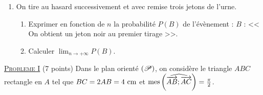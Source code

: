 \begin{description}
\begin{enumerate}
\begin{enumerate}
								$A$ : << On obtient un jeton rouge au premier tirage >>.
						\item Calculer $\displaystyle{\lim_{n\rightarrow +\infty} P(A)}$.
					\end{enumerate}
				\item On tire au hasard successivement et avec remise trois jetons de l'urne.
					\begin{enumerate}
						\item Exprimer en fonction de $n$ la probabilit\'e $P(B)$ de l'\'ev\`enement : \newline
								$B$ : << On obtient un jeton noir au premier tirage >>.
						\item Calculer $\displaystyle{\lim_{n\rightarrow +\infty} P(B)}$.
					\end{enumerate}
			\end{enumerate}
	\end{description}

\noindent \underline{\textsc{Probleme I}} (7 points) \newline
Dans le plan orient\'e $(\mathscr{P})$, on consid\`ere le triangle $ABC$ rectangle en $A$ tel que $BC = 2 AB = 4~\mathrm{cm}$ et 
$\mathrm{mes}\left( \widehat{ \overrightarrow{AB} ; \overrightarrow{AC} } \right) = \frac{\pi}{2}$.

